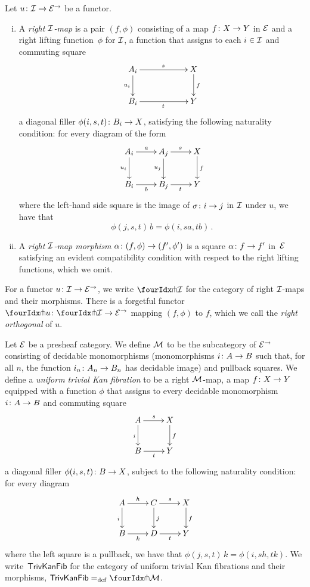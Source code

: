 \documentclass[reqno,10pt,a4paper,oneside,draft]{amsart}
\begin{document}
\begin{definition}
Let $u \co \cal{I} \to \catE^\to$ be a functor.
\begin{enumerate}[(i)]
\item A \emph{right $\cal{I}$-map} is a pair $(f, \phi)$ consisting of a map $f \co X \to Y$ in $\cal{E}$ and a right lifting function~$\phi$ for $\cal{I}$, \ie a function that assigns to each $i \in \cal{I}$ and commuting square
\[
\xymatrix@C=2cm{
A_i \ar[r]^{s} \ar[d]_{u_i} & X \ar[d]^f \\
B_i \ar[r]_{t} & Y}
\]
a diagonal filler $\phi(i,s, t) \co B_i \to X$, satisfying the following naturality condition: for every diagram of the form
\[
\xymatrix{
A_i \ar[r]^a \ar[d]_{u_i} & A_j \ar[r]^{s} \ar[d]_{u_j} & X \ar[d]^f \\
B_i \ar[r]_{b} & B_j \ar[r]_{t} & Y }
\]
where the left-hand side square is the image of $\sigma \co i \to j$ in $\cal{I}$ under $u$, we have that
\[
\phi(j, s, t) \, b = \phi(i, s a, t b) \, .
\]
\item A \emph{right $\cal{I}$-map morphism} $\alpha \co (f, \phi) \to (f', \phi')$ is a square $\alpha \co f \to f'$ in~$\catE$ satisfying an evident compatibility condition with respect to the right lifting functions, which we omit.
\end{enumerate}
\end{definition}

For a functor $u \co \cal{I} \to \catE^\to$, we write $\liftr{\cal{I}}$ for the category of right $\cal{I}$-maps and their morphisms.
There is a forgetful functor~$\liftr{u} \co \liftr{\cal{I}} \to \catE^\to$ mapping $(f, \phi)$ to $f$, which we call the \emph{right orthogonal} of $u$.

\begin{example} \label{exa-triv-kan-fib}
Let $\catE$ be a presheaf category.
We define $\cal{M}$ to be the subcategory of $\cal{E}^\to$ consisting of decidable monomorphisms (\ie monomorphisms $i \co A \to B$ such that, for all $n$, the function $i_n \co A_n \to B_n$ has decidable image) and pullback squares.
We define a \emph{uniform trivial Kan fibration} to be a right $\cal{M}$-map, \ie {} a map $f \co X \to Y$ equipped with a function $\phi$ that assigns to every decidable monomorphism $i \co A \to B$ and commuting square
\[
\xymatrix{
A \ar[r]^s \ar[d]_i & X \ar[d]^f \\
B \ar[r]_t & Y}
\]
a diagonal filler $\phi(i, s, t) \co B \to X$, subject to the following naturality condition: for every diagram
\[
\xymatrix{
A \ar[r]^{h} \ar[d]_{i} & C \ar[d]^{j} \ar[r]^s & X \ar[d]^f \\
B \ar[r]_{k} & D \ar[r]_t & Y }
\]
where the left square is a pullback, we have that $\phi(j, s, t) \, k = \phi(i, s h, t k)$.
We write~$\mathsf{TrivKanFib}$ for the category of uniform trivial Kan fibrations and their morphisms, \ie $\mathsf{TrivKanFib} \defeq \liftr{\cal{M}}$.
\end{example}
\end{document}
